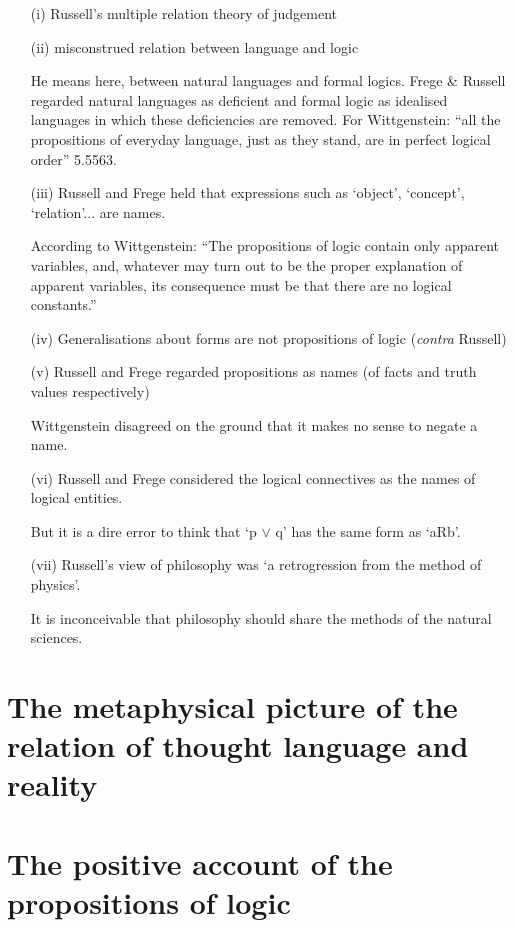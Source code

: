 \begin{itemize}
\item[(i)] Russell's multiple relation theory of judgement
\item[(ii)] misconstrued relation between language and logic

He means here, between natural languages and formal logics.
Frege \& Russell regarded natural languages as deficient and formal logic as idealised languages in which these deficiencies are removed.
For Wittgenstein: ``all the propositions of everyday language, just as they stand, are in perfect logical order'' \cite{wittgenstein1921} 5.5563.

\item[(iii)] Russell and Frege held that expressions such as `object', `concept', `relation'... are names.

According to Wittgenstein: ``The propositions of logic contain only apparent variables, and, whatever may turn out to be the proper explanation of apparent variables, its consequence must be that there are no logical constants.''

\item[(iv)] Generalisations about forms are not propositions of logic ({\it contra} Russell)
\item[(v)] Russell and Frege regarded propositions as names (of facts and truth values respectively)

Wittgenstein disagreed on the ground that it makes no sense to negate a name.
\item[(vi)] Russell and Frege considered the logical connectives as the names of logical entities.

But it is a dire error to think that `p $\vee$ q' has the same form as `aRb'.
\item[(vii)] Russell's view of philosophy was `a retrogression from the method of physics'.

It is inconceivable that philosophy should share the methods of the natural sciences.
\end{itemize}

\section{The metaphysical picture of the relation of thought language and reality}




\section{The positive account of the propositions of logic}

